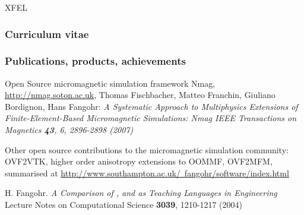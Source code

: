 \begin{sitedescription}{XFEL}
\subsubsection*{Curriculum vitae}

%

% 

%
\subsubsection*{Publications, products, achievements}

\begin{compactenum}
\item Open Source micromagnetic simulation framework Nmag,
  \href{http://nmag.soton.ac.uk}{http://nmag.soton.ac.uk}, Thomas
  Fischbacher, Matteo Franchin, Giuliano Bordignon, Hans Fangohr: \emph{
A Systematic Approach to Multiphysics Extensions of Finite-Element-Based Micromagnetic Simulations: Nmag
IEEE Transactions on Magnetics \textbf{43}, 6, 2896-2898 (2007)}
\item Other open source contributions to the micromagnetic simulation
  community: OVF2VTK, higher order anisotropy extensions to OOMMF,
  OVF2MFM, summarised at
  \href{http://www.southampton.ac.uk/~fangohr/software/index.html}{http://www.southampton.ac.uk/~fangohr/software/index.html}
\item H. Fangohr.
\emph{A Comparison of , \Matlab and \Python as Teaching Languages in Engineering}
Lecture Notes on Computational Science \textbf{3039}, 1210-1217 (2004)
\end{compactenum}

\end{sitedescription}







